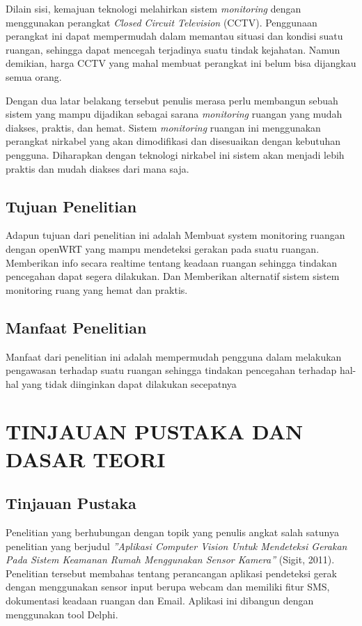 \documentclass{jtetiproposalskripsi}
\begin{document}
Dilain sisi, kemajuan teknologi melahirkan sistem \emph{monitoring} dengan menggunakan perangkat \emph{Closed Circuit Television} (CCTV). Penggunaan perangkat ini dapat mempermudah dalam memantau situasi dan kondisi suatu ruangan, sehingga dapat mencegah terjadinya suatu tindak kejahatan. Namun demikian,  harga CCTV yang mahal membuat perangkat ini belum bisa dijangkau semua orang.

Dengan dua latar belakang tersebut penulis merasa perlu membangun sebuah sistem yang mampu dijadikan sebagai sarana \emph{monitoring} ruangan yang mudah diakses, praktis, dan hemat. Sistem \emph{monitoring} ruangan ini menggunakan perangkat nirkabel yang akan dimodifikasi dan disesuaikan dengan kebutuhan pengguna. Diharapkan dengan teknologi nirkabel ini sistem akan menjadi lebih praktis dan mudah diakses dari mana saja.



\section{Tujuan Penelitian}
Adapun tujuan dari penelitian ini adalah Membuat system monitoring ruangan dengan openWRT yang mampu mendeteksi gerakan pada suatu ruangan. Memberikan info secara realtime tentang keadaan ruangan sehingga tindakan pencegahan dapat segera dilakukan. Dan Memberikan alternatif sistem sistem monitoring ruang yang hemat dan praktis.



\section{Manfaat Penelitian}
Manfaat dari penelitian ini adalah mempermudah pengguna dalam melakukan pengawasan terhadap suatu ruangan sehingga tindakan pencegahan terhadap hal-hal yang tidak diinginkan dapat dilakukan secepatnya

\chapter{TINJAUAN PUSTAKA DAN DASAR TEORI}                

\section{Tinjauan Pustaka}
Penelitian yang berhubungan dengan topik yang penulis angkat salah satunya penelitian yang berjudul \emph{''Aplikasi Computer Vision Untuk Mendeteksi Gerakan Pada Sistem Keamanan Rumah Menggunakan Sensor Kamera''} (Sigit, 2011). Penelitian tersebut membahas tentang perancangan aplikasi pendeteksi gerak dengan menggunakan sensor input berupa webcam dan memiliki fitur SMS, dokumentasi keadaan ruangan dan Email. Aplikasi ini dibangun dengan menggunakan tool Delphi.
\end{document}
